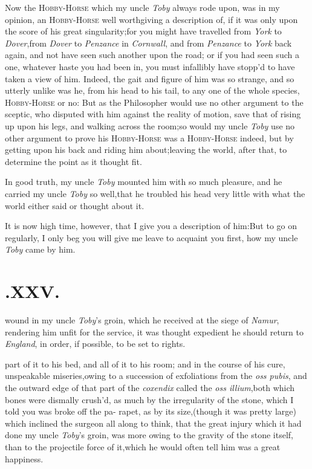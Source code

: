 \documentclass{article}
\begin{document}
Now the \textsc{Hobby-Horse} which my uncle \textit{Toby} always rode
upon, was in my opinion, an \textsc{Hobby-Horse} well worth\break giving
a description of, if it was only upon the score of his great
singularity;\break for you might have travelled from \textit{York} to
\textit{Dover},\tsk  from \textit{Dover} to \textit{Penzance} in
\textit{Cornwall}, and from \textit{Penzance} to \textit{York} back
again, and not have seen such another upon the road; or if you had seen
such a one, whatever haste you had been in, you must infallibly have
stopp’d to have taken a view of him. Indeed, the gait and figure of him
was so strange, and so utterly unlike was he, from his head to his tail,
to any one of the whole species, 
\textsc{Hobby-Horse} or no: But as the Philo\-so\-pher would use no other
argument to the sceptic, who disputed with him against the reality of
motion, save that of rising up upon his legs, and walking across the
room;\tsk  so would my uncle \textit{Toby} use no other argument to
prove his \textsc{Hobby-Horse} was a \textsc{Hobby-Horse} indeed, but by
getting upon his back and riding him about;\tsk  leaving the world,
after that, to determine the point as it thought fit.

In good truth, my uncle \textit{Toby} mounted him with so much
pleasure, and he carried my uncle \textit{Toby} so
well,\tsh  that he troubled his head very little with what
the world either said or thought about it.

It is now high time, however, that I give you a description of
him:\tsk  But to go on regularly, I only beg you will give me
leave to acquaint you first, how my uncle \textit{Toby} came by
him.

\section{.\enspace XXV.}

 wound in my uncle \textit{Toby}’s\break
groin, which he received at the\break
siege of \textit{Namur}, rendering him unfit for the
service, it was thought expedient he should return
to \textit{England}, in order, if possible, to be
set to rights.

\noindent
{}
part of it to his bed, and all of it to his room; and in the
course of his cure,\break{}
unspeakable miseries,\tsk  owing to a succession of exfoliations
from the \textit{oss pubis}, and the outward edge of that part of
the \textit{coxendix} called the \textit{oss illium},\tsh  both
which bones were dismally crush’d, as much by the irregularity
of the stone, which I told you was broke off the pa-
rapet,\tsk
as by its size,\tsk  (though it was pretty large) which inclined
the surgeon all along to think, that the great injury which it
had done my uncle \textit{Toby}’s groin, was more owing to the
gravity of the stone itself, than to the projectile force of
it,\tsk  which he would often tell him was a great happiness.
\end{document}

